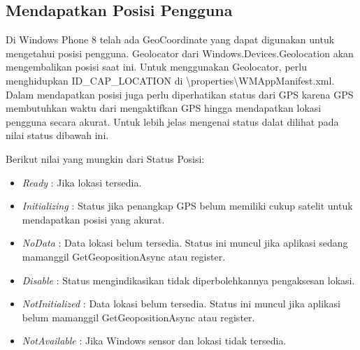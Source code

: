 \subsection{Mendapatkan Posisi Pengguna}
\label{subsec:Mendapatkan Posisi Pengguna}
\hspace{0.5cm} Di Windows Phone 8 telah ada GeoCoordinate yang dapat digunakan untuk mengetahui posisi pengguna. Geolocator dari Windows.Devices.Geolocation akan mengembalikan posisi saat ini. Untuk menggunakan Geolocator, perlu menghidupkan ID\_CAP\_LOCATION di \textbackslash properties\textbackslash WMAppManifest.xml. Dalam mendapatkan posisi juga perlu diperhatikan status dari GPS karena GPS membutuhkan waktu dari mengaktifkan GPS hingga mendapatkan lokasi pengguna secara akurat. Untuk lebih jelas mengenai status dalat dilihat pada nilai status dibawah ini.

Berikut nilai yang mungkin dari Status Posisi:
\begin{itemize}
	\item \textit{Ready} : Jika lokasi tersedia.
	\item \textit{Initializing} : Status jika penangkap GPS belum memiliki cukup satelit untuk mendapatkan posisi yang akurat. 
	\item \textit{NoData} : Data lokasi belum tersedia. Status ini muncul jika aplikasi sedang mamanggil GetGeopositionAsync atau register.
	\item \textit{Disable} : Status mengindikasikan tidak diperbolehkannya pengaksesan lokasi.
	\item \textit{NotInitialized} : Data lokasi belum tersedia. Status ini muncul jika aplikasi belum mamanggil GetGeopositionAsync atau register.
	\item \textit{NotAvailable} : Jika Windows sensor dan lokasi tidak tersedia.
\end{itemize}

